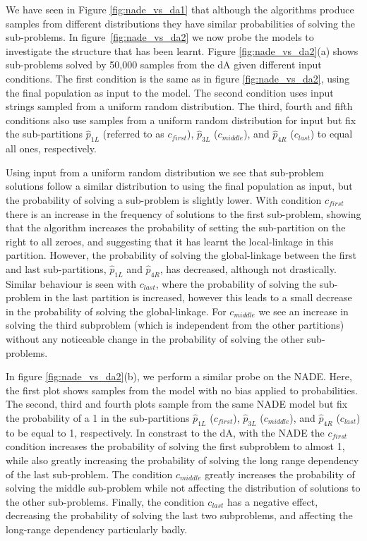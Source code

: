 \documentclass[twoside]{article}
\begin{document}
We have seen in Figure \ref{fig:nade_vs_da1} that although the algorithms produce samples from different distributions they have similar probabilities of solving the sub-problems. In figure~\ref{fig:nade_vs_da2} we now probe the models to investigate the structure that has been learnt. Figure \ref{fig:nade_vs_da2}(a) shows sub-problems solved by 50,000 samples from the dA given different input conditions. The first condition is the same as in figure \ref{fig:nade_vs_da2}, using the final population as input to the model. The second condition uses input strings sampled from a uniform random distribution. The third, fourth and fifth conditions also use samples from a uniform random distribution for input but fix the sub-partitions \(\hat{p}_{1L}\) (referred to as \(c_{first}\)),  \(\hat{p}_{3L}\) (\(c_{middle}\)), and \(\hat{p}_{4R}\) (\(c_{last}\)) to equal all ones, respectively.

Using input from a uniform random distribution we see that sub-problem solutions follow a similar distribution to using the final population as input, but the probability of solving a sub-problem is slightly lower. With condition \(c_{first}\) there is an increase in the frequency of solutions to the first sub-problem, showing that the algorithm increases the probability of setting the sub-partition on the right to all zeroes, and suggesting that it has learnt the local-linkage in this partition. However, the probability of solving the global-linkage between the first and last sub-partitions, \(\hat{p}_{1L}\) and \(\hat{p}_{4R}\), has decreased, although not drastically. Similar behaviour is seen with \(c_{last}\), where the probability of solving the sub-problem in the last partition is increased, however this leads to a small decrease in the probability of solving the global-linkage. For \(c_{middle}\) we see an increase in solving the third subproblem (which is independent from the other partitions) without any noticeable change in the probability of solving the other sub-problems.

In figure \ref{fig:nade_vs_da2}(b), we perform a similar probe on the NADE. Here, the first plot shows samples from the model with no bias applied to probabilities. The second, third and fourth plots sample from the same NADE model but fix the probability of a 1 in the sub-partitions \(\hat{p}_{1L}\) (\(c_{first}\)), \(\hat{p}_{3L}\) (\(c_{middle}\)), and \(\hat{p}_{4R}\) (\(c_{last}\)) to be equal to 1, respectively. In constrast to the dA, with the NADE the \(c_{first}\) condition increases the probability of solving the first subproblem to almost 1, while also greatly increasing the probability of solving the long range dependency of the last sub-problem. The condition \(c_{middle}\) greatly increases the probability of solving the middle sub-problem while not affecting the distribution of solutions to the other sub-problems. Finally, the condition \(c_{last}\) has a negative effect, decreasing the probability of solving the last two subproblems, and affecting the long-range dependency particularly badly.
\end{document}
